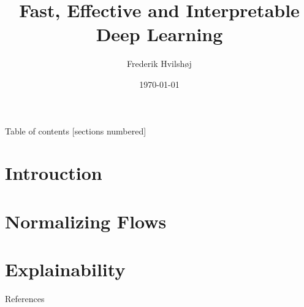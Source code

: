 \documentclass[10pt,aspectratio=169]{beamer}
\title{Fast, Effective and Interpretable Deep Learning}
\date{\today}
\author{Frederik Hvilshøj}
\begin{document}
\maketitle

\begin{frame}{Table of contents}
  [sections numbered]
  \tableofcontents[hideallsubsections]
\end{frame}

\section{Introuction}


\section{Normalizing Flows}


\section{Explainability}



\appendix
\begin{frame}[t, allowframebreaks]{References}
	 
	\begingroup
	\renewcommand{\section}[2]{}%
	\footnotesize
	
	\endgroup

\end{frame}
\end{document}
